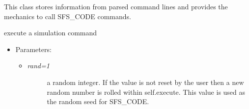 \documentclass[letterpaper,10pt,english]{sphinxmanual}
\begin{document}
\begin{fulllineitems}
\label{index:command.Command}
This class stores information from parsed command lines
and provides the mechanics to call SFS\_CODE commands.

\begin{fulllineitems}
\label{index:command.Command.execute}
execute a simulation command
\begin{itemize}
\item {} 
Parameters:
\begin{itemize}
\item {} \begin{description}
\item[{\emph{rand=1} }] \leavevmode
a random integer. If the value is not reset by the user
then a new random number is rolled within self.execute.
This value is used as the random seed for SFS\_CODE.

\end{description}

\end{itemize}

\end{itemize}

\end{fulllineitems}


\end{fulllineitems}

\end{document}
